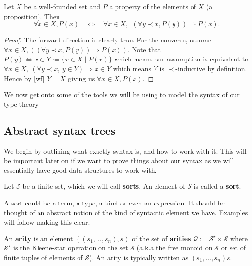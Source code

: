 \begin{theorem}
    Let $X$ be a well-founded set and $P$ a property of the elements of $X$ (a proposition). Then
    $$
        \forall x \in X, P(x) \quad \iff \quad  \forall x \in X,\ \ (\forall y \prec x, P(y)) \Rightarrow P(x).
    $$
\end{theorem}
\begin{proof}
    The forward direction is clearly true. For the converse, assume $\forall x \in X,((\forall y \prec x, P(y)) \Rightarrow P(x))$. Note that $P(y) \Leftrightarrow x \in Y := \{ x \in X \mid P(x)\} $ which means our assumption is equivalent to $\forall x \in X,\ (\forall y \prec x,\ y \in Y) \Rightarrow x \in Y$ which means $Y$ is $\prec$-inductive by definition. Hence by \ref{wf} $Y=X$ giving us $ \forall x \in X, P(x)$.
\end{proof}

We now get onto some of the tools we will be using to model the syntax of our type theory. 

\subsection{Abstract syntax trees}

We begin by outlining what exactly syntax is, and how to work with it. This will be important later on if we want to prove things about our syntax as we will essentially have good data structures to work with.


\begin{defin}[Sorts]
    Let $\mathcal{S}$ be a finite set, which we will call \textbf{sorts}. An element of $\mathcal{S}$ is called a \textbf {sort}.
\end{defin}

A sort could be a term, a type, a kind or even an expression. It should be thought of an abstract notion of the kind of syntactic element we have. Examples will follow making this clear.

\begin{defin}[Arities]
    An \textbf{arity} is an element $((s_1,\dots,s_n),s)$ of the set of \textbf{arities} $\mathcal{Q}:=\mathcal{S}^\star \times \mathcal{S}$ where $\mathcal{S}^\star$ is the Kleene-star operation on the set $\mathcal{S}$ (a.k.a the free monoid on $\mathcal{S}$ or set of finite tuples of elements of $\mathcal{S}$). An arity is typically written as $(s_1,\dots,s_n)s$. 
\end{defin}

